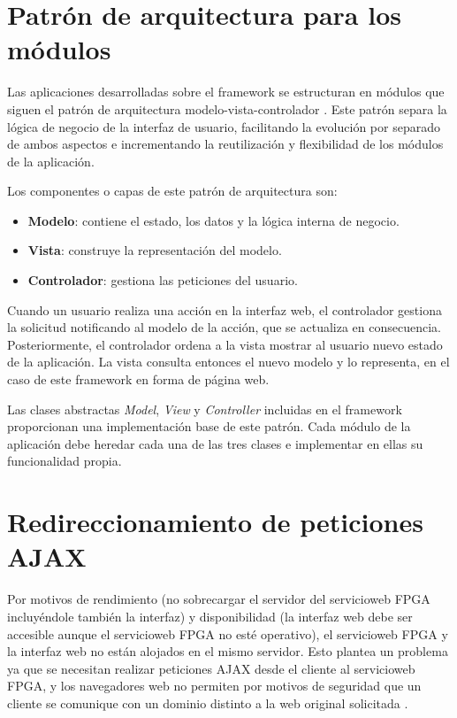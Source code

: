 \section{Patrón de arquitectura para los módulos\label{extra:mvc:mvc}}

Las aplicaciones desarrolladas sobre el \gls{framework} se estructuran en módulos que siguen el patrón de arquitectura modelo-vista-controlador \cite{mvcpattern}. Este patrón separa la lógica de negocio de la interfaz de usuario, facilitando la evolución por separado de ambos aspectos e incrementando la reutilización y flexibilidad de los módulos de la aplicación.

Los componentes o capas de este patrón de arquitectura son:
\begin{itemize}
  \item \textbf{Modelo}: contiene el estado, los datos y la lógica interna de negocio.
  \item \textbf{Vista}: construye la representación del modelo.
  \item \textbf{Controlador}: gestiona las peticiones del usuario.
\end{itemize}

Cuando un usuario realiza una acción en la interfaz web, el controlador gestiona la solicitud notificando al modelo de la acción, que se actualiza en consecuencia. Posteriormente, el controlador ordena a la vista mostrar al usuario nuevo estado de la aplicación. La vista consulta entonces el nuevo modelo y lo representa, en el caso de este \gls{framework} en forma de página web.

Las clases abstractas \textit{Model}, \textit{View} y \textit{Controller} incluidas en el \gls{framework} proporcionan una implementación base de este patrón. Cada módulo de la aplicación debe heredar cada una de las tres clases e implementar en ellas su funcionalidad propia.


\section{Redireccionamiento de peticiones \gls{AJAX}\label{extra:mvc:proxy}}

Por motivos de rendimiento (no sobrecargar el servidor del \gls{servicioweb} \gls{FPGA} incluyéndole también la interfaz) y disponibilidad (la interfaz web debe ser accesible aunque el \gls{servicioweb} \gls{FPGA} no esté operativo), el \gls{servicioweb} \gls{FPGA} y la interfaz web no están alojados en el mismo servidor. Esto plantea un problema ya que se necesitan realizar peticiones \gls{AJAX} desde el cliente al \gls{servicioweb} \gls{FPGA}, y los navegadores web no permiten por motivos de seguridad que un cliente se comunique con un dominio distinto a la web original solicitada \cite{sameorigin}.

